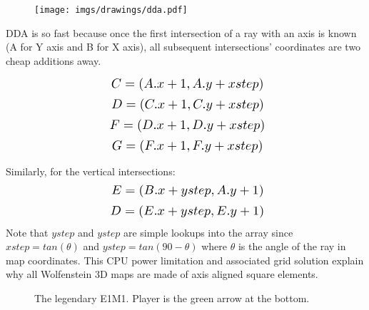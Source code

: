  \par
\begin{figure}[H]
  \centering
 \texttt{[image: imgs/drawings/dda.pdf]}
\end{figure}
\par
DDA is so fast because once the first intersection of a ray with an axis is known (A for Y axis and B for X axis), all subsequent intersections' coordinates are two cheap additions away.
\par


\begin{equation*}
    \scalebox{1.3}{
$C = (A.x +1, A.y + xstep)$\\
}
\end{equation*}
\begin{equation*}
    \scalebox{1.3}{
$D = (C.x +1, C.y + xstep)$\\
}
\end{equation*}
\begin{equation*}
    \scalebox{1.3}{
$F = (D.x +1, D.y + xstep)$\\
}
\end{equation*}
\begin{equation*}
    \scalebox{1.3}{
$G = (F.x +1, F.y + xstep)$\\
}
\end{equation*}


\par
Similarly, for the vertical intersections:\\
  \begin{equation*}
    \scalebox{1.3}{

$E = (B.x + ystep, A.y + 1)$\\
}
\end{equation*}
  \begin{equation*}
    \scalebox{1.3}{
$D = (E.x + ystep, E.y + 1)$\\
}
\end{equation*}
Note that $ystep$ and $ystep$ are simple lookups into the  array since $xstep=tan(\theta)$ and $ystep=tan(90-\theta)$ where $\theta$ is the angle of the ray in map coordinates. This CPU power limitation and associated grid solution explain why all Wolfenstein 3D maps are made of axis aligned square elements.\\
\par
\begin{figure}[H]
  \centering
 \label{mape1m1}
 \caption{The legendary E1M1. Player is the green arrow at the bottom.}
\end{figure}


